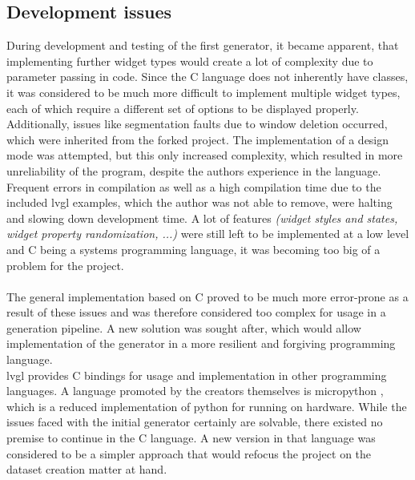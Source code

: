 \documentclass[Bachelor, BIC, english, fhCitStyle, IEEE]{BASE/twbook} %
\begin{document}
\subsection{Development issues}
During development and testing of the first generator, it became apparent, that implementing further widget types would create a lot of complexity due to parameter passing in code. Since the C language does not inherently have classes, it was considered to be much more difficult to implement multiple widget types, each of which require a different set of options to be displayed properly.\\
Additionally, issues like segmentation faults due to window deletion occurred, which were inherited from the forked project. The implementation of a design mode was attempted, but this only increased complexity, which resulted in more unreliability of the program, despite the authors experience in the language. Frequent errors in compilation as well as a high compilation time due to the included \ac{lvgl} examples, which the author was not able to remove, were halting and slowing down development time. A lot of features \textit{(widget styles and states, widget property randomization, ...)} were still left to be implemented at a low level and C being a systems programming language, it was becoming too big of a problem for the project.\\\\
The general implementation based on C proved to be much more error-prone as a result of these issues and was therefore considered too complex for usage in a generation pipeline. A new solution was sought after, which would allow implementation of the generator in a more resilient and forgiving programming language.\\
\ac{lvgl} provides C bindings \autocite{LvglLv_binding_micropythonLVGL} for usage and implementation in other programming languages. A language promoted by the creators themselves is micropython \autocite{LvglLv_micropythonMicropython}, which is a reduced implementation of python for running on hardware. While the issues faced with the initial generator certainly are solvable, there existed no premise to continue in the C language. A new version in that language was considered to be a simpler approach that would refocus the project on the dataset creation matter at hand.
\clearpage
\end{document}
